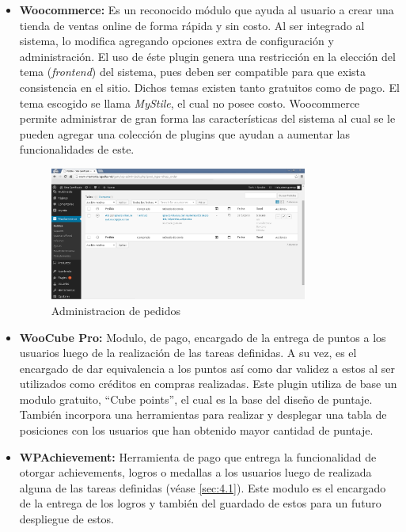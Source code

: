 \begin{itemize}

    \item {\bf Woocommerce:}
        Es un reconocido módulo que ayuda al usuario a crear una tienda de
        ventas online de forma rápida y sin costo.
        Al ser integrado al sistema, lo modifica agregando opciones
        extra de configuración y administración.
        El uso de éste plugin genera una restricción en la elección
        del tema (\emph{frontend}) del sistema, pues deben ser compatible
        para que exista consistencia en el sitio.
        Dichos temas existen tanto gratuitos como de pago.
        El tema escogido se llama \emph{MyStile}, el cual no posee costo.
        Woocommerce permite administrar de gran forma las características del
        sistema al cual se le pueden agregar una colección de plugins que ayudan a
        aumentar las funcionalidades de este.

\begin{figure}[!htb]
  \centering
  \includegraphics[width=0.8\textwidth]{images/pedidos.png}
  \caption[administracion]{Administracion de pedidos}
  \label{fig:Players}
\end{figure}


    \item {\bf WooCube Pro:}
        Modulo, de pago, encargado de la entrega de puntos a los usuarios luego de
        la realización de las tareas definidas.
        A su vez, es el encargado de dar equivalencia a los puntos así como dar
        validez a estos al ser utilizados como créditos en compras realizadas.
        Este plugin utiliza de base un modulo gratuito, ``Cube points'',
        el cual es la base del diseño de puntaje.
        También incorpora una herramientas para realizar y desplegar una tabla
        de posiciones con los usuarios que han obtenido mayor cantidad de puntaje.



    \item {\bf WPAchievement:}
        Herramienta de pago que entrega la funcionalidad de otorgar achievements,
        logros o medallas a los usuarios luego de realizada alguna de las tareas
        definidas (véase \ref{sec:4.1}).
        Este modulo es el encargado de la entrega de los logros y también del
        guardado de estos para un futuro despliegue de estos.


\end{itemize}
